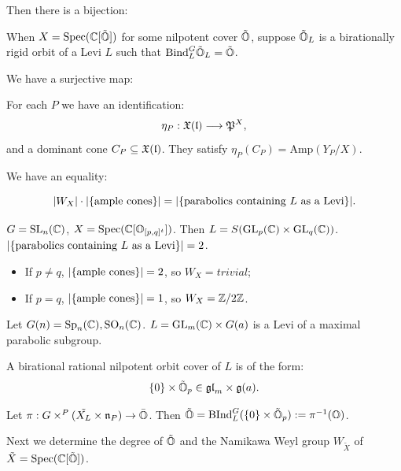 Then there is a bijection:


When $X = \operatorname{Spec}(\mathbb{C}[\tilde{\mathbb{O}}])$ for some nilpotent cover $\tilde{\mathbb{O}}$, suppose $\tilde{\mathbb{O}}_L$ is a birationally rigid orbit of a Levi $L$ such that $\mathrm{Bind}_L^G \tilde{\mathbb{O}}_L = \tilde{\mathbb{O}}$.

We have a surjective map:


For each $P$ we have an identification: 
\[
  \eta_P: \mathfrak{X}(\mathfrak{l}) \longrightarrow \mathfrak{P}^X,
\]
and a dominant cone $C_P \subseteq \mathfrak{X}(\mathfrak{l})$. They satisfy $\eta_P(C_P) = \mathrm{Amp}(Y_P/X)$.

We have an equality:

\[
  \lvert W_X\rvert \cdot  \lvert\{ \textrm{ample cones} \}\rvert = \lvert\{\textrm{parabolics containing $L$ as a Levi}\}\rvert. 
\]

\begin{examp}
  $G = \operatorname{SL}_n(\mathbb{C})$, $X = \operatorname{Spec}(\mathbb{C}[\mathbb{O}_{[p,q]^t}])$. Then $L = S(\operatorname{GL}_p(\mathbb{C}) \times \operatorname{GL}_q(\mathbb{C}))$. $\lvert\{\textrm{parabolics containing $L$ as a Levi}\}\rvert = 2$.
  \begin{itemize}
    \item If $p \neq q$, $\lvert\{ \textrm{ample cones} \}\rvert = 2$, so $W_X = trivial$;
    \item If $p = q$, $\lvert\{ \textrm{ample cones} \}\rvert = 1$, so $W_X = \mathbb{Z}/2\mathbb{Z}$.
  \end{itemize}
\end{examp}






Let $G(n) = \operatorname{Sp}_{n}(\mathbb{C}), \operatorname{SO}_{n}(\mathbb{C})$. $L = \operatorname{GL}_m(\mathbb{C}) \times G(a)$ is a Levi of a maximal parabolic subgroup.

A birational rational nilpotent orbit cover of $L$ is of the form:
\[
  \{0\} \times \tilde{\mathbb{O}}_p \in \mathfrak{gl}_m \times \mathfrak{g}(a).
\]

Let $\pi: G \times^P (\tilde{X_L} \times \mathfrak{n}_P) \to \bar{\mathbb{O}}$. Then $\tilde{\mathbb{O}} = \mathrm{BInd}_L^G(\{0\} \times \tilde{\mathbb{O}}_p) := \pi^{-1}(\mathbb{O})$.

Next we determine the degree of $\tilde{\mathbb{O}}$ and the Namikawa Weyl group $W_{\tilde{X}}$ of $\tilde{X} = \operatorname{Spec}(\mathbb{C}[\tilde{\mathbb{O}}])$.

